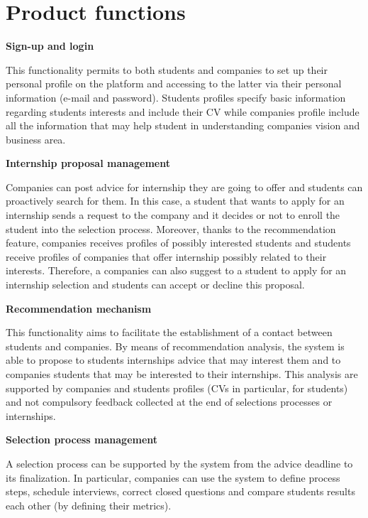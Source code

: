 	\section{Product functions}
		\textbf{Sign-up and login}
			\begin{flushleft}
				This functionality permits to both students and companies to set up their personal profile on the platform and accessing to the latter via their personal information (e-mail and password). Students profiles specify basic information regarding students interests and include their CV while companies profile include all the information that may help student in understanding companies vision and business area.
			\end{flushleft}
		\textbf{Internship proposal management}
			\begin{flushleft}
				Companies can post advice for internship they are going to offer and students can proactively search for them. In this case, a student that wants to apply for an internship sends a request to the company and it decides or not to enroll the student into the selection process. Moreover, thanks to the recommendation feature, companies receives profiles of possibly interested students and students receive profiles of companies that offer internship possibly related to their interests. Therefore, a companies can also suggest to a student to apply for an internship selection and students can accept or decline this proposal.
			\end{flushleft}
		\textbf{Recommendation mechanism}
			\begin{flushleft}
				This functionality aims to facilitate the establishment of a contact between students and companies. By means of recommendation analysis, the system is able to propose to students internships advice that may interest them and to companies students that may be interested to their internships. This analysis are supported by companies and students profiles (CVs in particular, for students) and not compulsory feedback collected at the end of selections processes or internships.
			\end{flushleft}
		\textbf{Selection process management}
			\begin{flushleft}
				A selection process can be supported by the system from the advice deadline to its finalization. In particular, companies can use the system to define process steps, schedule interviews, correct closed questions and compare students results each other (by defining their metrics).
			\end{flushleft}
